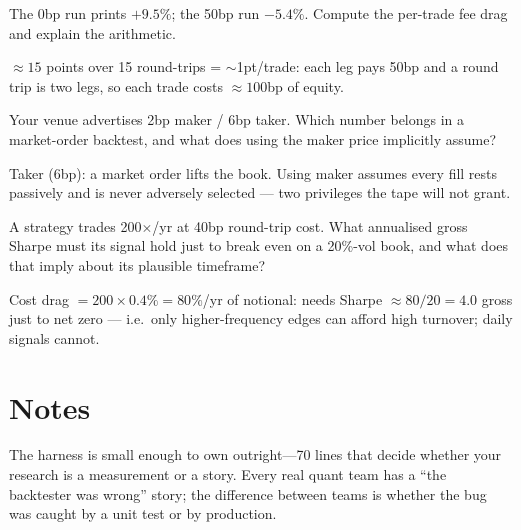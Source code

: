 \begin{exercise}[easy]
The 0bp run prints $+9.5\%$; the 50bp run $-5.4\%$. Compute the
per-trade fee drag and explain the arithmetic.
\end{exercise}
\begin{solution}
$\approx 15$ points over 15 round-trips = $\sim$1pt/trade: each
leg pays 50bp and a round trip is two legs, so each trade costs
$\approx 100$bp of equity.
\end{solution}
\begin{exercise}[medium]
Your venue advertises 2bp maker / 6bp taker. Which number belongs
in a market-order backtest, and what does using the maker price
implicitly assume?
\end{exercise}
\begin{solution}
Taker (6bp): a market order lifts the book. Using maker assumes
every fill rests passively and is never adversely selected ---
two privileges the tape will not grant.
\end{solution}
\begin{exercise}[hard]
A strategy trades 200$\times$/yr at 40bp round-trip cost. What
annualised gross Sharpe must its signal hold just to break even on
a 20\%-vol book, and what does that imply about its plausible
timeframe?
\end{exercise}
\begin{solution}
Cost drag $=200\times0.4\%=80\%$/yr of notional: needs Sharpe
$\approx 80/20 = 4.0$ gross just to net zero --- i.e.\ only
higher-frequency edges can afford high turnover; daily signals
cannot.
\end{solution}

\section*{Notes}
The harness is small enough to own outright---70 lines that decide whether your research is
a measurement or a story. Every real quant team has a ``the backtester was wrong'' story;
the difference between teams is whether the bug was caught by a unit test or by production.

